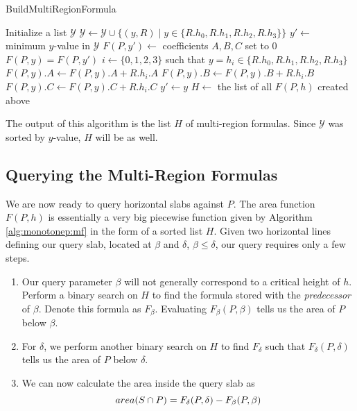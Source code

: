 \begin{algorithm}
\LinesNumbered
\DontPrintSemicolon
\caption{BuildMultiRegionFormula}
\label{alg:monotonep:mf}
\BlankLine
Initialize a list $\mathcal{Y}$\;
{
$\mathcal{Y} \gets \mathcal{Y} \cup \{ (y,R) \;|\; y \in \{R.h_0, R.h_1, R.h_2, R.h_3\}\}$\;
}
\;
\BlankLine
$y' \gets $ minimum $y$-value in $\mathcal{Y}$\;
$F(P, y') \gets $ coefficients $A,B,C$ set to 0\;
\BlankLine
{}
{
$F(P, y) = F(P, y')$\;
$i \gets \{0,1,2,3\}$ such that $y = h_i \in \{R.h_0, R.h_1, R.h_2, R.h_3\}$\;
$F(P,y).A \gets F(P,y).A + R.h_i.A$\;
$F(P,y).B \gets F(P,y).B + R.h_i.B$\;
$F(P,y).C \gets F(P,y).C + R.h_i.C$\;
\BlankLine
$y' \gets y$\;
}
\BlankLine
$H \gets $ the list of all $F(P, h)$ created above\;
\end{algorithm}

The output of this algorithm is the list $H$ of multi-region formulas. Since $\mathcal{Y}$ was sorted by $y$-value, $H$ will be as well.


\subsection{Querying the Multi-Region Formulas}
\label{:monotonep:query-mf}

We are now ready to query horizontal slabs against $P$. The area function $F(P,h)$ is essentially a very big piecewise function given by Algorithm \ref{alg:monotonep:mf} in the form of a sorted list $H$. Given two horizontal lines defining our query slab, located at $\beta$ and $\delta$, $\beta \leq \delta$, our query requires only a few steps.

\begin{enumerate}
\item Our query parameter $\beta$ will not generally correspond to a critical height of $h$. Perform a binary search on $H$ to find the formula stored with the \emph{predecessor} of $\beta$. Denote this formula as $F_\beta$. Evaluating $F_\beta(P, \beta)$ tells us the area of $P$ below $\beta$.

\item For $\delta$, we perform another binary search on $H$ to find $F_\delta$ such that $F_\delta(P, \delta)$ tells us the area of $P$ below $\delta$.

\item We can now calculate the area inside the query slab as
\[ 
area(S \cap P) = F_\delta(P, \delta) - F_\beta(P, \beta)
\]

\end{enumerate}

